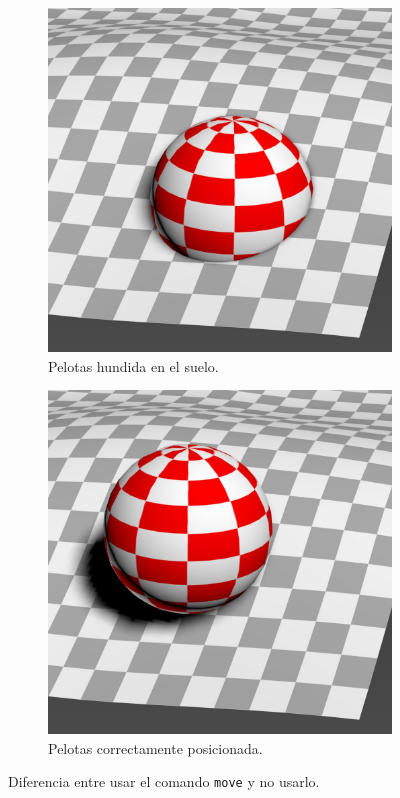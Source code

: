 \begin{figure}[H]
    \centering 
	\begin{subfigure}[t]{0.3\textwidth}
	    \centering
	    \includegraphics[width=\textwidth]{imagenes/posicion/hundido.jpg}
        \caption{Pelotas hundida en el suelo.}
    \end{subfigure}
    \hspace{20px}
	\begin{subfigure}[t]{0.3\textwidth}
	    \centering
	    \includegraphics[width=\textwidth]{imagenes/posicion/normal.jpg}
        \caption{Pelotas correctamente posicionada.}
    \end{subfigure}    
    \caption{Diferencia entre usar el comando \texttt{move} y no usarlo.}
\end{figure}

